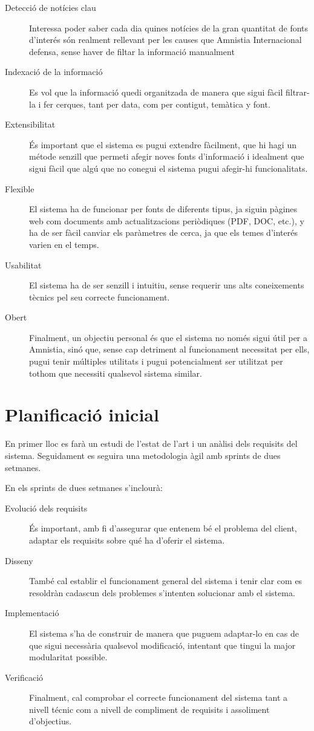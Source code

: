 \documentclass{article}
\begin{document}
\begin{description}
    \item[Detecció de notícies clau] Interessa poder saber cada dia quines notícies de la gran quantitat de fonts d'interés són realment rellevant per les causes que Amnistia Internacional defensa, sense haver de filtar la informació manualment
    \item[Indexació de la informació] Es vol que la informació quedi organitzada de manera que sigui fàcil filtrar-la i fer cerques, tant per data, com per contigut, temàtica y font.
    \item[Extensibilitat] És important que el sistema es pugui extendre fàcilment, que hi hagi un métode senzill que permeti afegir noves fonts d'informació i idealment que sigui fàcil que algú que no conegui el sistema pugui afegir-hi funcionalitats.
    \item[Flexible] El sistema ha de funcionar per fonts de diferents tipus, ja siguin pàgines web com documents amb actualitzacions periòdiques (PDF, DOC, etc.), y ha de ser fàcil canviar els paràmetres de cerca, ja que els temes d'interés varien en el temps.
    \item[Usabilitat] El sistema ha de ser senzill i intuitiu, sense requerir uns alts coneixements tècnics pel seu correcte funcionament.
    \item[Obert] Finalment, un objectiu personal és que el sistema no només sigui útil per a Amnistia, sinó que, sense cap detriment al funcionament necessitat per ells, pugui tenir múltiples utilitats i pugui potencialment ser utilitzat per tothom que necessiti qualsevol sistema similar.
\end{description}

\newpage

\section{Planificació inicial}

En primer lloc es farà un estudi de l'estat de l'art i un anàlisi dels requisits del sistema. Seguidament es seguira una metodologia àgil amb sprints de dues setmanes.

En els sprints de dues setmanes s'inclourà:

\begin{description}
    \item[Evolució dels requisits] És important, amb fi d'assegurar que entenem bé el problema del client, adaptar els requisits sobre qué ha d'oferir el sistema.
    \item[Disseny] També cal establir el funcionament general del sistema i tenir clar com es resoldràn cadascun dels problemes s'intenten solucionar amb el sistema.
    \item[Implementació] El sistema s'ha de construir de manera que puguem adaptar-lo en cas de que sigui necessària qualsevol modificació, intentant que tingui la major modularitat possible.
    \item[Verificació] Finalment, cal comprobar el correcte funcionament del sistema tant a nivell técnic com a nivell de compliment de requisits i assoliment d'objectius.
\end{description}
\end{document}
